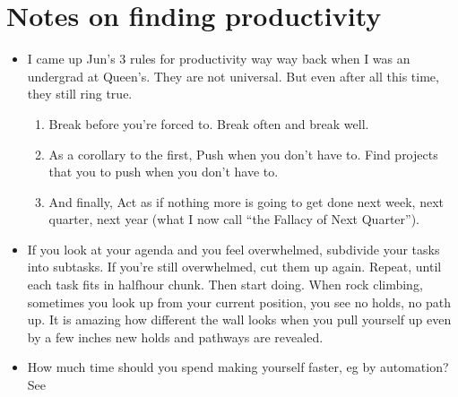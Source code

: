\documentclass[letterpaper,10pt,english]{sphinxmanual}
\begin{document}
\section{Notes on finding productivity}
\label{\detokenize{06UserGuideToJun:notes-on-finding-productivity}}\begin{itemize}
\item {} 
\sphinxAtStartPar
I came up Jun’s 3 rules for productivity way way back when I was an undergrad at Queen’s. They are not universal. But even after all this time, they still ring true.
\begin{enumerate}
%
\item {} 
\sphinxAtStartPar
Break before you’re forced to. Break often and break well.

\item {} 
\sphinxAtStartPar
As a corollary to the first, Push when you don’t have to. Find projects that you  to push when you don’t have to.

\item {} 
\sphinxAtStartPar
And finally, Act as if nothing more is going to get done next week, next quarter, next year (what I now call “the Fallacy of Next Quarter”).

\end{enumerate}

\item {} 
\sphinxAtStartPar
If you look at your agenda and you feel overwhelmed, subdivide your tasks into subtasks. If you’re still overwhelmed, cut them up again. Repeat, until each task fits in half\sphinxhyphen{}hour chunk. Then start doing. When rock climbing, sometimes you look up from your current position, you see no holds, no path up. It is amazing how different the wall looks when you pull yourself up even by a few inches \textendash{} new holds and pathways are revealed.

\item {} 
\sphinxAtStartPar
How much time should you spend making yourself faster, eg by automation? See 

\end{itemize}



\renewcommand{\indexname}{Index}
\printindex
\end{document}

